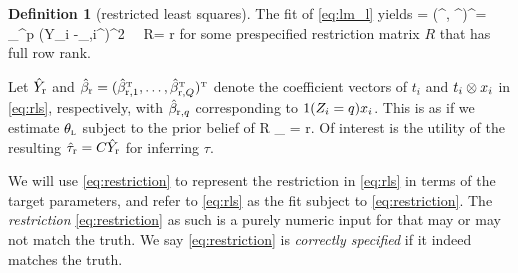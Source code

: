 \documentclass[11pt]{article}
\theoremstyle{definition}
\newtheorem{definition}{Definition}
\begin{document}
\begin{definition}[restricted least squares]
The \rlss fit of \eqref{eq:lm_l} yields
\beginy\label{eq:rls}
\hthlr = (\hyr ^\T, \hbr^\T)^\T= \argmin_{\theta \in {}^p} \sumi (Y_i -\chi_{\lin,i}^\T \theta)^2 \qquad {} \ \ R\theta = r
\endy
for some prespecified restriction matrix $R$ that has full row rank.
\end{definition}
Let $\hat Y_{\textup{r}} $ and $\hat\beta_{\textup{r}} = (\hat\beta_{\textup{r},1}^{ \mathrm{\scriptscriptstyle T} }, \dots, \hat\beta_{\textup{r},Q}^{ \mathrm{\scriptscriptstyle T} })^{ \mathrm{\scriptscriptstyle T} }$ denote the \rlss coefficient vectors of $t_i$ and $t_i \otimes x_i$ in \eqref{eq:rls}, respectively, with $\hat\beta_{\textup{r},q} $ corresponding to  $1(Z_i=q) x_i $. 
This is as if we estimate $\theta_{\textsc{l}}$ subject to the prior belief of 
\beginy\label{eq:restriction}
R \theta_\lin %
= r.
\endy
Of interest is the utility of the resulting $\hat\tau_{\textup{r}} = C\hat Y_{\textup{r}}$ for inferring $\tau$. 


We will use \eqref{eq:restriction} to represent the restriction in \eqref{eq:rls} in terms of the target parameters, and refer to \eqref{eq:rls} as the \rolss fit subject to \eqref{eq:restriction}.
The {\it restriction} \eqref{eq:restriction} as such is a purely numeric input for \rolss that may or may not match the truth.
We say \eqref{eq:restriction}  is {\it correctly specified} if it indeed matches the truth.
\end{document}

